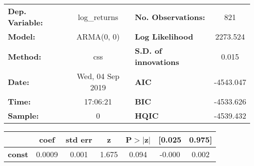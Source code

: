 \begin{center}
\begin{tabular}{lclc}
\toprule
\textbf{Dep. Variable:} &   log\_returns   & \textbf{  No. Observations:  } &    821      \\
\textbf{Model:}         &    ARMA(0, 0)    & \textbf{  Log Likelihood     } &  2273.524   \\
\textbf{Method:}        &       css        & \textbf{  S.D. of innovations} &   0.015     \\
\textbf{Date:}          & Wed, 04 Sep 2019 & \textbf{  AIC                } & -4543.047   \\
\textbf{Time:}          &     17:06:21     & \textbf{  BIC                } & -4533.626   \\
\textbf{Sample:}        &        0         & \textbf{  HQIC               } & -4539.432   \\
\bottomrule
\end{tabular}
\begin{tabular}{lcccccc}
               & \textbf{coef} & \textbf{std err} & \textbf{z} & \textbf{P$> |$z$|$} & \textbf{[0.025} & \textbf{0.975]}  \\
\midrule
\textbf{const} &       0.0009  &        0.001     &     1.675  &         0.094        &       -0.000    &        0.002     \\
\bottomrule
\end{tabular}
\end{center}
